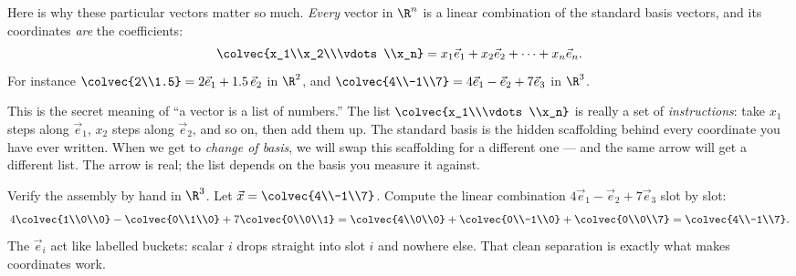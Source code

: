 Here is why these particular vectors matter so much. \emph{Every} vector in $\R^n$ is a
linear combination of the standard basis vectors, and its coordinates \emph{are} the
coefficients:
\[
  \colvec{x_1\\x_2\\\vdots\\x_n}
  = x_1\vec{e}_1 + x_2\vec{e}_2 + \cdots + x_n\vec{e}_n.
\]
For instance $\colvec{2\\1.5} = 2\vec{e}_1 + 1.5\,\vec{e}_2$ in $\R^2$, and
$\colvec{4\\-1\\7} = 4\vec{e}_1 - \vec{e}_2 + 7\vec{e}_3$ in $\R^3$.

\begin{focusbox}
This is the secret meaning of ``a vector is a list of numbers.'' The list
$\colvec{x_1\\\vdots\\x_n}$ is really a set of \emph{instructions}: take $x_1$ steps along
$\vec{e}_1$, $x_2$ steps along $\vec{e}_2$, and so on, then add them up. The standard basis
is the hidden scaffolding behind every coordinate you have ever written. When we get to
\emph{change of basis}, we will swap this scaffolding for a different one --- and the same
arrow will get a different list. The arrow is real; the list depends on the basis you
measure it against.
\end{focusbox}

\begin{labbox}
Verify the assembly by hand in $\R^3$. Let $\vec{x}=\colvec{4\\-1\\7}$. Compute the linear
combination $4\vec{e}_1 - \vec{e}_2 + 7\vec{e}_3$ slot by slot:
\[
  4\colvec{1\\0\\0} - \colvec{0\\1\\0} + 7\colvec{0\\0\\1}
  = \colvec{4\\0\\0} + \colvec{0\\-1\\0} + \colvec{0\\0\\7}
  = \colvec{4\\-1\\7}.
\]
The $\vec{e}_i$ act like labelled buckets: scalar $i$ drops straight into slot $i$ and
nowhere else. That clean separation is exactly what makes coordinates work.
\end{labbox}

